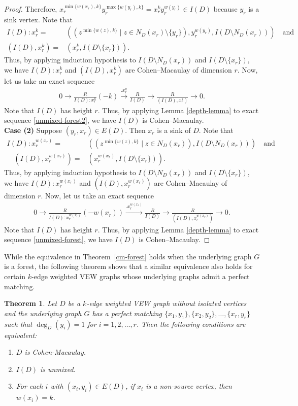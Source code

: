 \documentclass[11pt,reqno]{amsart}
\newtheorem{theorem}{Theorem}[section]
\theoremstyle{definition}
\begin{document}
\begin{proof}
    Therefore, $x_r^{\min\{w(x_r),k\}}y_r^{\max\{w(y_r),k\}}=x_r^{k}y_r^{w(y_r)} \in I(D)$ because $y_r$ is a sink vertex.  Note that
	\begin{align*}
		I(D): x_r^{k} =& \left((z^{\min\{w(z),k\}} \mid z \in N_D(x_r)\setminus\{y_r\}), y_r^{w(y_r)}, I(D\setminus N_D(x_r))\right) \quad \text{and} \quad \\
		(I(D), x_r^{k}) = &(x_r^{k}, I(D\setminus\{x_r\})).
	\end{align*}
Thus, by applying induction hypothesis to $I(D\setminus N_D(x_r))$ and $I(D\setminus\{x_r\})$, we have $I(D): x_r^{k}$ and $(I(D), x_r^{k})$ are Cohen–Macaulay of dimension $r$. Now, let us take an exact sequence
	\begin{align}\label{unmixed-forest2}
		0 \rightarrow \frac{R}{I(D): x_r^{k}}(-k) \xrightarrow{ .x_r^{k} } \frac{R}{I(D)} \rightarrow \frac{R}{(I(D),x_r^{k})} \rightarrow 0 . 
	\end{align}
	Note that $I(D)$ has height $r$. Thus, by applying Lemma \ref{depth-lemma} to exact sequence \eqref{unmixed-forest2}, we have $I(D)$ is Cohen–Macaulay.  \\
	\noindent
	\textbf{Case (2)} Suppose $(y_r, x_r) \in E(D)$. Then $x_r$ is a sink of $D$. Note that
	\begin{align*}
		I(D): x_r^{w(x_r)} =& \left((z^{\min\{w(z),k\}} \mid z \in N_D(x_r)), I(D\setminus N_D(x_r))\right) \quad \text{and} \\\quad (I(D), x_r^{w(x_r)}) =& \left(x_r^{w(x_r)}, I(D\setminus\{x_r\})\right).
	\end{align*}
Thus, by applying induction hypothesis to $I(D\setminus N_D(x_r))$ and $I(D\setminus \{x_r\})$, we have $I(D): x_r^{w(x_r)}$ and $(I(D), x_r^{w(x_r)})$ are Cohen–Macaulay of dimension $r$. Now, let us take an exact sequence
	\begin{align}\label{unmixed-forest}
		0 \rightarrow \frac{R}{I(D): x_r^{w(x_r)}}(-w(x_r)) \xrightarrow{ .x_r^{w(x_r)} }\frac{R}{I(D)} \rightarrow \frac{R}{(I(D), x_r^{w(x_r)})} \rightarrow 0 . 
	\end{align}
	Note that $I(D)$ has height $r$. Thus, by applying Lemma \ref{depth-lemma} to exact sequence \eqref{unmixed-forest}, we have $I(D)$ is Cohen–Macaulay. 
\end{proof}
While the equivalence in Theorem~\ref{cm-forest} holds when the underlying graph $G$ is a forest, the following theorem shows that a similar equivalence also holds for certain $k$-edge weighted VEW graphs whose underlying graphs admit a perfect matching.
\begin{theorem}\label{cm-graph}
	Let $D$ be a $k$-edge weighted VEW graph without isolated vertices and the underlying graph $G$ has a perfect matching $\{x_1,y_1\}, \{x_2,y_2\}, \ldots, \{x_r,y_r\}$ such that $\deg_D(y_i)=1$ for $i=1,2,\ldots,r$. 
	Then the following conditions are equivalent: 
	\begin{enumerate}
		\item $D$ is Cohen-Macaulay. 
		\item $I(D)$ is unmixed.
		\item For each $i$ with $(x_i,y_i) \in E(D)$, if $x_i$ is a non-source vertex, then $w(x_i)=k$.
	\end{enumerate} 
\end{theorem}
\end{document}
